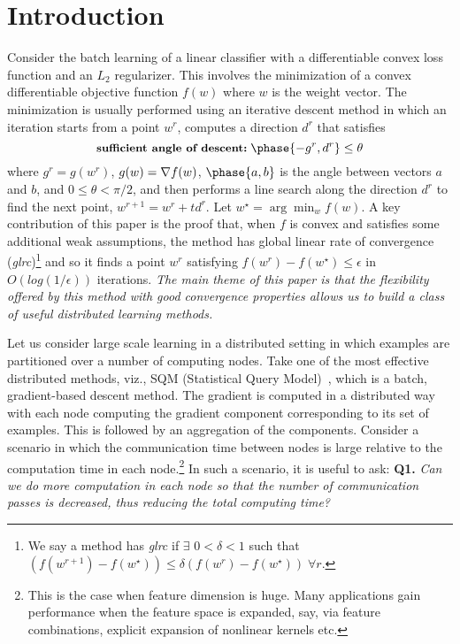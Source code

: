 \section{Introduction}
\label{intro}

Consider the batch learning of a linear classifier with a differentiable convex loss function and an $L_2$ regularizer. This involves the minimization of a convex differentiable objective function $f(w)$ where $w$ is the weight vector. The minimization is usually performed using an iterative descent method in which an iteration starts from a point $w^r$, computes a direction $d^r$ that satisfies
\begin{equation}
\mbox{{\small\bf sufficient angle of descent:}}\; \phase{-g^r, d^r} \le \theta \label{angle}
\end{equation}
where $g^r=g(w^r)$, $g(w)=\nabla f(w)$, $\phase{a,b}$ is the angle between vectors $a$ and $b$, and $0 \le \theta < \pi/2$, and then performs a line search along the direction $d^r$ to find the next point, $w^{r+1}=w^r+t d^r$. Let $w^\star=\arg\min_w f(w)$. A key contribution of this paper is the proof that, when $f$ is convex and satisfies some additional weak assumptions, the method has global linear rate of convergence ({\it glrc})\footnote{We say a method has {\it glrc} if $\exists$ $0<\delta<1$ such that $(f(w^{r+1})-f(w^\star)) \le \delta (f(w^r)-f(w^\star))\;\forall r$.} and so it finds a point $w^r$ satisfying $f(w^r)-f(w^\star)\le\epsilon$ in $O(log(1/\epsilon))$ iterations. {\it The main theme of this paper is that the flexibility offered by this method with good convergence properties allows us to build a class of useful distributed learning methods.}

Let us consider large scale learning in a distributed setting in which examples are partitioned over a number of computing nodes. Take one of the most effective distributed methods, viz., SQM (Statistical Query Model)~\cite{chu2006,agarwal2011}, which is a batch, gradient-based descent method. The gradient is computed in a distributed way with each node computing the gradient component corresponding to its set of examples. This is followed by an aggregation of the components. Consider a scenario in which the communication time between nodes is large relative to the computation time in each node.\footnote{This is the case when feature dimension is huge. Many applications gain performance when the feature space is expanded, say, via feature combinations, explicit expansion of nonlinear kernels etc.} In such a scenario, it is useful to ask: {\bf Q1.} {\it Can we do more computation in each node so that the number of communication passes is decreased, thus reducing the total computing time?}

